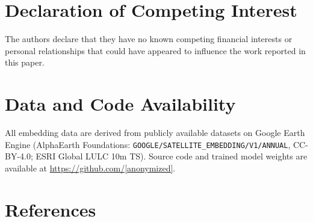 \documentclass{article}
\begin{document}
\section*{Declaration of Competing Interest}
The authors declare that they have no known competing financial interests or personal relationships that could have appeared to influence the work reported in this paper.

\section*{Data and Code Availability}
All embedding data are derived from publicly available datasets on Google Earth Engine (AlphaEarth Foundations: \texttt{GOOGLE/SATELLITE\_EMBEDDING/V1/ANNUAL}, CC-BY-4.0; ESRI Global LULC 10m TS). Source code and trained model weights are available at \url{https://github.com/[anonymized]}.


\section*{References}
\end{document}
